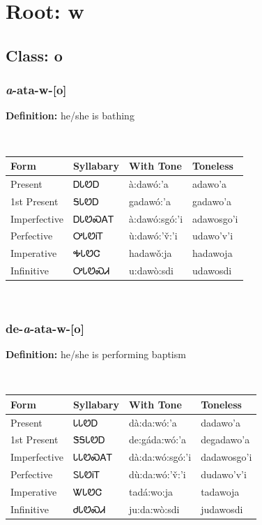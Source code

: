 \needspace{4in}
\section*{Root: w}
\nopagebreak
{}
\needspace{3in}
\subsection*{Class: o}
\nopagebreak
\needspace{2in}
\subsubsection*{\textit{a}{-}ata{-}\textbf{w}{-}[o]}
\nopagebreak
\textbf{Definition: } he/she is bathing
\\[0.5em]
\begin{tabularx}{\textwidth}{l X X X}%
\toprule%
\textbf{Form}&\textbf{Syllabary}&\textbf{With Tone}&\textbf{Toneless}\\%
\midrule%
Present&ᎠᏓᏬᎠ&à:dawó:’a&adawo’a\\%
1st Present&ᎦᏓᏬᎠ&gadawó:’a&gadawo’a\\%
Imperfective&ᎠᏓᏬᏍᎪᎢ&à:dawó:sgó:’i&adawosgo’i\\%
Perfective&ᎤᏓᏬᎥᎢ&ù:dawó:’v̌:’i&udawo’v’i\\%
Imperative&ᎭᏓᏬᏣ&hadawǒ:ja&hadawoja\\%
Infinitive&ᎤᏓᏬᏍᏗ&u:dawò:sdi&udawosdi\\%
\bottomrule%
\end{tabularx}
\\[1em]
\needspace{2in}
\subsubsection*{de{-}\textit{a}{-}ata{-}\textbf{w}{-}[o]}
\nopagebreak
\textbf{Definition: } he/she is performing baptism
\\[0.5em]
\begin{tabularx}{\textwidth}{l X X X}%
\toprule%
\textbf{Form}&\textbf{Syllabary}&\textbf{With Tone}&\textbf{Toneless}\\%
\midrule%
Present&ᏓᏓᏬᎠ&dà:da:wó:’a&dadawo’a\\%
1st Present&ᏕᎦᏓᏬᎠ&de:gáda:wó:’a&degadawo’a\\%
Imperfective&ᏓᏓᏬᏍᎪᎢ&dà:da:wó:sgó:’i&dadawosgo’i\\%
Perfective&ᏚᏓᏬᎥᎢ&dù:da:wó:’v̌:’i&dudawo’v’i\\%
Imperative&ᏔᏓᏬᏣ&tadá:wo:ja&tadawoja\\%
Infinitive&ᏧᏓᏬᏍᏗ&ju:da:wò:sdi&judawosdi\\%
\bottomrule%
\end{tabularx}
\\[1em]